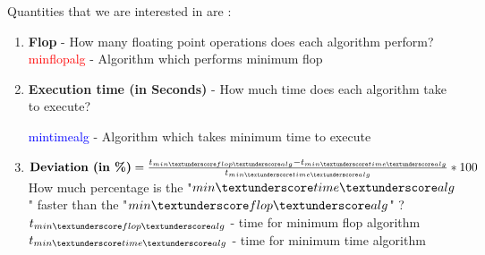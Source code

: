 \documentclass[10pts]{beamer}
\begin{document}
	 \begin{frame}[t]{Quantities that we are interested in are :}
	 	\begin{center}
	 		\begin{enumerate}[(\roman{*})]
	 		\item \textbf{Flop} - How many floating point operations does each algorithm perform? \\
	 		
	 			\textcolor{red}{min\textunderscore flop\textunderscore alg}   - Algorithm which performs minimum flop\\
	 		
	 		\item \textbf{Execution time (in Seconds)} - How much time does each algorithm take to execute?
	 		
	 			\textcolor{blue}{min\textunderscore time\textunderscore alg}   - Algorithm which takes minimum time to execute\\
	 		\item $\textbf{Deviation (in \%)} = \frac{t_{min \textunderscore flop \textunderscore alg}-t_{min\textunderscore time \textunderscore alg}}{t_{min \textunderscore time \textunderscore alg}} *100$ \\
	 		How much percentage is the "$min\textunderscore time\textunderscore alg$" faster than the "$min\textunderscore flop\textunderscore alg$" ? \\
	 	
	 		\textcolor{red}{$t_{min \textunderscore flop \textunderscore alg}$} - time for minimum flop algorithm\\
	 		\textcolor{blue}{$t_{min\textunderscore time \textunderscore alg}$}  -  time for minimum time algorithm
	 		\end{enumerate}
	 	\end{center}
	 	
	 	
	 		
	 		
	 \end{frame}
	 
	 
	 
\end{document}
